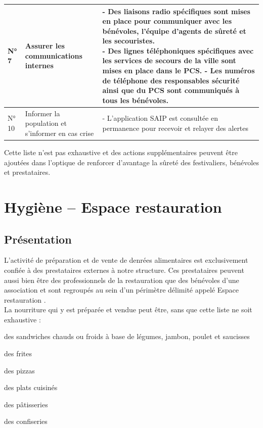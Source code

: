 \documentclass[hidelinks, paper=a4, fontsize=13pt]{report}
\begin{document}
\begin{center}
\begin{tabular}{| p{1.5cm} | p{4cm} | p{10cm} |}
  N° 7 &
  \parbox[t]{4cm}{Assurer les communications internes} & 
  \parbox[t]{10cm}{- Des liaisons radio spécifiques sont mises en place pour communiquer avec les bénévoles, l'équipe d'agents de sûreté et les secouristes.\\
  - Des lignes téléphoniques spécifiques avec les services de secours de la ville sont mises en place dans le PCS.
  - Les numéros de téléphone des responsables sécurité ainsi que du PCS sont communiqués à tous les bénévoles.\\}
 \\
 \hline
  N° 10 &
  \parbox[t]{4cm}{Informer la population et s'informer en cas crise\\}  & 
  \parbox[t]{10cm}{- L'application SAIP est consultée en permanence pour recevoir et relayer des alertes}
 \\
 \hline 
\end{tabular}
\end{center}

Cette liste n'est pas exhaustive et des actions supplémentaires peuvent être ajoutées dans l'optique de renforcer d'avantage la sûreté des festivaliers, bénévoles et prestataires.


\newpage
\chapter{Hygiène – Espace restauration}

\section{Présentation}

L'activité de préparation et de vente de denrées alimentaires est exclusivement confiée à des prestataires externes à notre structure. Ces prestataires peuvent aussi bien être des professionnels de la restauration que des bénévoles d'une association et sont regroupés au sein d'un périmètre délimité appelé \og Espace restauration \fg. \\

La nourriture qui y est préparée et vendue peut être, sans que cette liste ne soit exhaustive :
\begin{list}{•}{}
	\item des sandwiches chauds ou froids à base de légumes, jambon, poulet et saucisses
	\item des frites
	\item des pizzas
	\item des plats cuisinés
	\item des pâtisseries
	\item des confiseries
\end{list}
\end{document}
